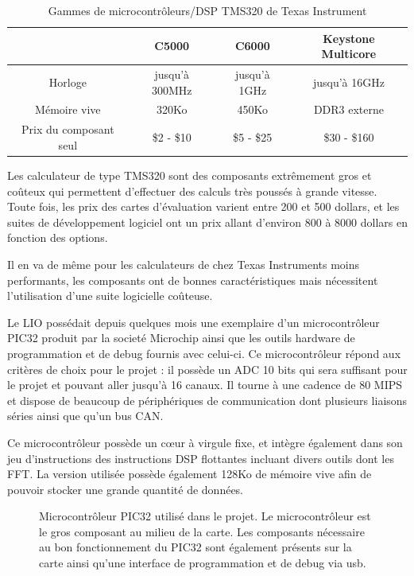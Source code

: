 \documentclass[letterpaper, twoside, 12pt, memoire, creativecommons, hyperref]{thETS}
\begin{document}
\begin{table}[ht]
	\caption{Gammes de microcontrôleurs/DSP TMS320 de Texas Instrument }
		\begin{tabular}{|c|c|c|c|}
		\hline
			& C5000 & C6000 & Keystone Multicore\\
	    \hline
	    	Horloge & jusqu'à 300MHz & jusqu'à 1GHz & jusqu'à 16GHz\\
	    \hline
			Mémoire vive & 320Ko & 450Ko & DDR3 externe\\
	    \hline
	    	Prix du composant seul & \$2 - \$10 & \$5 - \$25 & \$30 - \$160\\
	    \hline
		\end{tabular}
	\label{tab:tms320}
\end{table}

Les calculateur de type TMS320 sont des composants extrêmement gros et coûteux qui permettent d'effectuer des calculs très poussés à grande vitesse.  Toute fois, les prix des cartes d'évaluation varient entre 200 et 500 dollars, et les suites de développement logiciel ont un prix allant d'environ 800 à 8000 dollars en fonction des options. 

Il en va de même pour les calculateurs de chez Texas Instruments moins performants, les composants ont de bonnes caractéristiques mais nécessitent l'utilisation d'une suite logicielle coûteuse. 

Le LIO possédait depuis quelques mois une exemplaire d'un microcontrôleur PIC32 produit par la societé Microchip ainsi que les outils hardware de programmation et de debug fournis avec celui-ci. Ce microcontrôleur répond aux critères de choix pour le projet : il possède un ADC 10 bits qui sera suffisant pour le projet et pouvant aller jusqu’à 16 canaux. Il tourne à une cadence de 80 MIPS et dispose de beaucoup de périphériques de communication dont plusieurs liaisons séries ainsi que qu’un bus CAN. 

Ce microcontrôleur possède un cœur à virgule fixe, et intègre également dans son jeu d'instructions des instructions DSP flottantes incluant divers outils dont les FFT. La version utilisée possède également 128Ko de mémoire vive afin de pouvoir stocker une grande quantité de données.

\begin{figure}
	\centering
	\caption{Microcontrôleur PIC32 utilisé dans le projet. Le microcontrôleur est le gros composant au milieu de la carte. Les composants nécessaire au bon fonctionnement du PIC32 sont également présents sur la carte ainsi qu'une interface de programmation et de debug via usb.}
	\label{fig:inverseur}
\end{figure}
\end{document}
